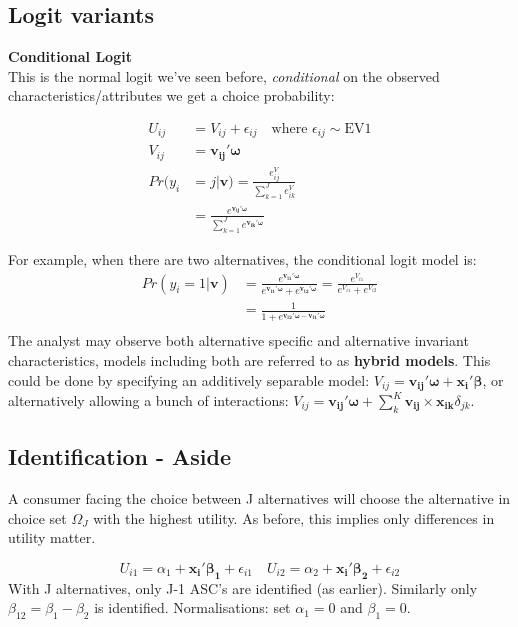 \documentclass[DIV=14,titlepage=false]{scrreprt}
\begin{document}
\subsection{Logit variants}
\textbf{Conditional Logit}\\
This is the normal logit we've seen before, \textit{conditional} on the observed characteristics/attributes we get a choice probability:
\begin{definition}
    \begin{align*}
        U_{ij} &= V_{ij} + \epsilon_{ij} \quad \text{where } \epsilon_{ij} \sim \text{EV1} \\
        V_{ij} &= \mathbf{v_{ij}'\omega} \\
        Pr(y_i &= j|\mathbf{v}) = \frac{e^V_{ij}}{\sum_{k=1}^J e^V_{ik}}\\
        &= \frac{e^{\mathbf{v_{ij}'\omega}}}{\sum_{k=1}^J e^{\mathbf{v_{ik}'\omega}}}
    \end{align*}  
\end{definition}
For example, when there are two alternatives, the conditional logit model is:
\begin{align*}
    Pr(y_i = 1|\mathbf{v}) &= \frac{e^{\mathbf{v_{i1}'\omega}}}{e^{\mathbf{v_{i1}'\omega}} + e^{\mathbf{v_{i2}'\omega}}} = \frac{e^{V_{i1}}}{e^{V_{i1}} + e^{V_{i2}}} \\
    &= \frac{1}{1 + e^{\mathbf{v_{i2}'\omega} - \mathbf{v_{i1}'\omega}}} \\
\end{align*}
The analyst may observe both alternative specific and alternative invariant characteristics, models including both are referred to as \textbf{hybrid models}. This could be done by specifying an additively separable model: $V_{ij} = \mathbf{v_{ij}'\omega} + \mathbf{x_i'\beta}$, or alternatively allowing a bunch of interactions: $V_{ij} = \mathbf{v_{ij}'\omega} + \sum_{k}^K \mathbf{v_{ij}}\times \mathbf{x_{ik}}\delta_{jk}$.\\
\subsection{Identification - Aside}
A consumer facing the choice between J alternatives will choose the alternative in choice set $\Omega_J$ with the highest utility. As before, this implies only differences in utility matter.
\begin{example}
    \[
        U_{i1} = \alpha_1 + \mathbf{x_i'\beta_1}+\epsilon_{i1} \quad U_{i2} = \alpha_2 + \mathbf{x_i'\beta_2}+\epsilon_{i2} 
    \]
    With J alternatives, only J-1 ASC's are identified (as earlier). Similarly only $\beta_{12}= \beta_1 - \beta_2$ is identified. Normalisations: set $\alpha_1 = 0$ and $\beta_1 = 0$.
\end{example}
\end{document}

